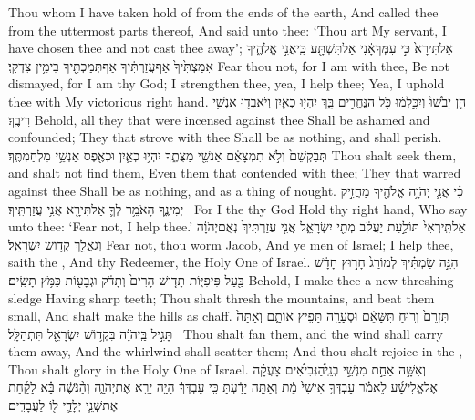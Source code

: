{Thou whom I have taken hold of from the ends of the earth, And called thee from the uttermost parts thereof, And said unto thee: ‘Thou art My servant, I have chosen thee and not cast thee away’;}
{אַל\maqqaf תִּירָא֙ כִּ֣י עִמְּךָ\maqqaf אָ֔נִי אַל\maqqaf תִּשְׁתָּ֖ע כִּֽי\maqqaf אֲנִ֣י אֱלֹהֶ֑יךָ אִמַּצְתִּ֙יךָ֙ אַף\maqqaf עֲזַרְתִּ֔יךָ אַף\maqqaf תְּמַכְתִּ֖יךָ בִּימִ֥ין צִדְקִֽי׃}
{Fear thou not, for I am with thee, Be not dismayed, for I am thy God; I strengthen thee, yea, I help thee; Yea, I uphold thee with My victorious right hand.}
{הֵ֤ן יֵבֹ֙שׁוּ֙ וְיִכָּ֣לְמ֔וּ כֹּ֖ל הַנֶּחֱרִ֣ים בָּ֑ךְ יִהְי֥וּ כְאַ֛יִן וְיֹאבְד֖וּ אַנְשֵׁ֥י רִיבֶֽךָ׃}
{Behold, all they that were incensed against thee Shall be ashamed and confounded; They that strove with thee Shall be as nothing, and shall perish.}
{תְּבַקְשֵׁם֙ וְלֹ֣א תִמְצָאֵ֔ם אַנְשֵׁ֖י מַצֻּתֶ֑ךָ יִהְי֥וּ כְאַ֛יִן וּכְאֶ֖פֶס אַנְשֵׁ֥י מִלְחַמְתֶּֽךָ׃}
{Thou shalt seek them, and shalt not find them, Even them that contended with thee; They that warred against thee Shall be as nothing, and as a thing of nought.}
{כִּ֗י אֲנִ֛י יְהֹוָ֥ה אֱלֹהֶ֖יךָ מַחֲזִ֣יק יְמִינֶ֑ךָ הָאֹמֵ֥ר לְךָ֛ אַל\maqqaf תִּירָ֖א אֲנִ֥י עֲזַרְתִּֽיךָ׃ \setuma }
{For I the \lord\space thy God Hold thy right hand, Who say unto thee: ‘Fear not, I help thee.’}
{אַל\maqqaf תִּֽירְאִי֙ תּוֹלַ֣עַת יַעֲקֹ֔ב מְתֵ֖י יִשְׂרָאֵ֑ל אֲנִ֤י עֲזַרְתִּיךְ֙ נְאֻם\maqqaf יְהֹוָ֔ה וְגֹאֲלֵ֖ךְ קְד֥וֹשׁ יִשְׂרָאֵֽל׃}
{Fear not, thou worm Jacob, And ye men of Israel; I help thee, saith the \lord, And thy Redeemer, the Holy One of Israel.}
{הִנֵּ֣ה שַׂמְתִּ֗יךְ לְמוֹרַג֙ חָר֣וּץ חָדָ֔שׁ בַּ֖עַל פִּיפִיּ֑וֹת תָּד֤וּשׁ הָרִים֙ וְתָדֹ֔ק וּגְבָע֖וֹת כַּמֹּ֥ץ תָּשִֽׂים׃}
{Behold, I make thee a new threshing-sledge Having sharp teeth; Thou shalt thresh the mountains, and beat them small, And shalt make the hills as chaff.}
{תִּזְרֵם֙ וְר֣וּחַ תִּשָּׂאֵ֔ם וּסְעָרָ֖ה תָּפִ֣יץ אוֹתָ֑ם וְאַתָּה֙ תָּגִ֣יל בַּֽיהֹוָ֔ה בִּקְד֥וֹשׁ יִשְׂרָאֵ֖ל תִּתְהַלָּֽל׃ \setuma }
{Thou shalt fan them, and the wind shall carry them away, And the whirlwind shall scatter them; And thou shalt rejoice in the \lord, Thou shalt glory in the Holy One of Israel.}
\newperek
{}
\label{haft_4}
\setcounter{chap}{4}
\setcounter{verse}{1}
{וְאִשָּׁ֣ה אַחַ֣ת מִנְּשֵׁ֣י בְנֵֽי\maqqaf הַ֠נְּבִיאִ֠ים צָעֲקָ֨ה אֶל\maqqaf אֱלִישָׁ֜ע לֵאמֹ֗ר עַבְדְּךָ֤ אִישִׁי֙ מֵ֔ת וְאַתָּ֣ה יָדַ֔עְתָּ כִּ֣י עַבְדְּךָ֔ הָיָ֥ה יָרֵ֖א אֶת\maqqaf יְהֹוָ֑ה וְהַ֨נֹּשֶׁ֔ה בָּ֗א לָקַ֜חַת אֶת\maqqaf שְׁנֵ֧י יְלָדַ֛י ל֖וֹ לַעֲבָדִֽים׃}
